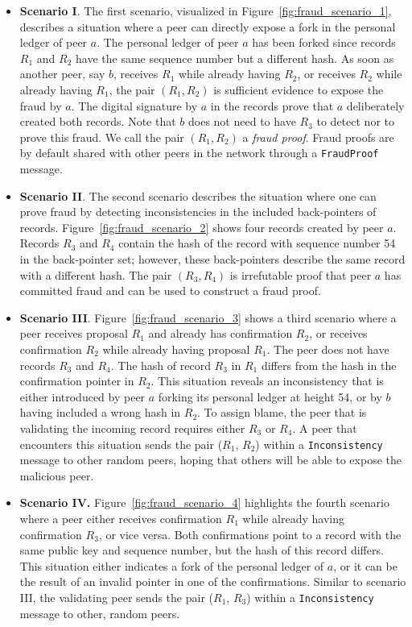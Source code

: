 \begin{itemize}
	\item \textbf{Scenario I}. 
	The first scenario, visualized in Figure~\ref{fig:fraud_scenario_1}, describes a situation where a peer can directly expose a fork in the personal ledger of peer $ a $.
	The personal ledger of peer $ a $ has been forked since records $ R_1 $ and $ R_2 $ have the same sequence number but a different hash.
	As soon as another peer, say $ b $, receives $ R_1 $ while already having $ R_2 $, or receives $ R_2 $ while already having $ R_1 $, the pair $ (R_1, R_2) $ is sufficient evidence to expose the fraud by $ a $.
	The digital signature by $ a $ in the records prove that $ a $ deliberately created both records.
	Note that $ b $ does not need to have $ R_3 $ to detect nor to prove this fraud.
	We call the pair $ (R_1, R_2) $ a \emph{fraud proof}.
	Fraud proofs are by default shared with other peers in the network through a \texttt{FraudProof} message.
	\item \textbf{Scenario II}. The second scenario describes the situation where one can prove fraud by detecting inconsistencies in the included back-pointers of records.
	Figure~\ref{fig:fraud_scenario_2} shows four records created by peer $ a $.
	Records $ R_3 $ and $ R_4 $ contain the hash of the record with sequence number 54 in the back-pointer set; however, these back-pointers describe the same record with a different hash.
	The pair $ (R_3, R_4) $ is irrefutable proof that peer $ a $ has committed fraud and can be used to construct a fraud proof.
	\item \textbf{Scenario III}.
	Figure~\ref{fig:fraud_scenario_3} shows a third scenario where a peer receives proposal $ R_1 $ and already has confirmation $ R_2 $, or receives confirmation $ R_2 $ while already having proposal $ R_1 $.
	The peer does not have records $ R_3 $ and $ R_4 $.
	The hash of record $ R_3 $ in $ R_1 $ differs from the hash in the confirmation pointer in $ R_2 $.
	This situation reveals an inconsistency that is either introduced by peer $ a $ forking its personal ledger at height 54, or by $ b $ having included a wrong hash in $ R_2 $.
	To assign blame, the peer that is validating the incoming record requires either $ R_3 $ or $ R_4 $.
	A peer that encounters this situation sends the pair ($ R_1 $, $ R_2 $) within a \texttt{Inconsistency} message to other random peers, hoping that others will be able to expose the malicious peer.
	\item \textbf{Scenario IV.}
	Figure~\ref{fig:fraud_scenario_4} highlights the fourth scenario where a peer either receives confirmation $ R_1 $ while already having confirmation $ R_3 $, or vice versa.
	Both confirmations point to a record with the same public key and sequence number, but the hash of this record differs.
	This situation either indicates a fork of the personal ledger of $ a $, or it can be the result of an invalid pointer in one of the confirmations.
	Similar to scenario III, the validating peer sends the pair ($ R_1 $, $ R_3 $) within a \texttt{Inconsistency} message to other, random peers.
\end{itemize}

